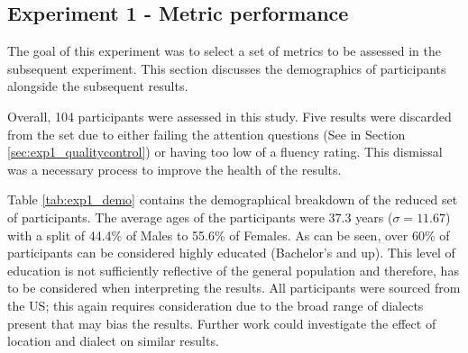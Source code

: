\subsection{Experiment 1 - Metric performance}

The goal of this experiment was to select a set of metrics to be assessed in the subsequent experiment. This section discusses the demographics of participants alongside the subsequent results.


Overall, 104 participants were assessed in this study. Five results were discarded from the set due to either failing the attention questions (See in Section \ref{sec:exp1_qualitycontrol}) or having too low of a fluency rating. This dismissal was a necessary process to improve the health of the results. 

Table \ref{tab:exp1_demo} contains the demographical breakdown of the reduced set of participants. The average ages of the participants were 37.3 years ($\sigma = 11.67$) with a split of 44.4\% of Males to 55.6\% of Females. As can be seen, over 60\% of participants can be considered highly educated (Bachelor’s and up). This level of education is not sufficiently reflective of the general population and therefore, has to be considered when interpreting the results. All participants were sourced from the US; this again requires consideration due to the broad range of dialects present that may bias the results. Further work could investigate the effect of location and dialect on similar results. 

